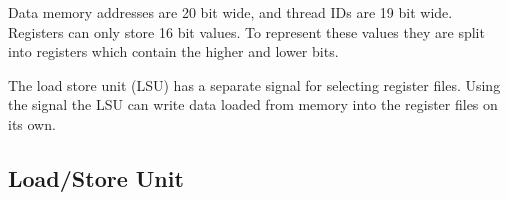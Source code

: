 \documentclass[../main/report.tex]{subfiles}
\begin{document}
Data memory addresses are 20 bit wide, and thread IDs are 19 bit wide.
Registers can only store 16 bit values.	
To represent these values they are split into registers which contain the higher and lower bits.

The load store unit (LSU) has a separate signal for selecting register files.
Using the signal the LSU can write data loaded from memory into the register files on its own.


\subsection{Load/Store Unit}
\end{document}

